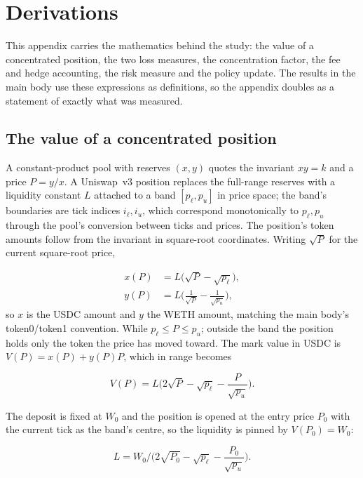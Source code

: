 \section{Derivations}
\label{app:derivations}

This appendix carries the mathematics behind the study: the value of a
concentrated position, the two loss measures, the concentration factor, the
fee and hedge accounting, the risk measure and the policy update. The results
in the main body use these expressions as definitions, so the appendix doubles
as a statement of exactly what was measured.

\subsection{The value of a concentrated position}

A constant-product pool with reserves $(x,y)$ quotes the invariant
$xy=k$ and a price $P=y/x$. A Uniswap~v3 position replaces the full-range
reserves with a liquidity constant $L$ attached to a band
$[p_\ell,p_u]$ in price space; the band's boundaries are tick indices
$i_\ell,i_u$, which correspond monotonically to $p_\ell,p_u$ through the
pool's conversion between ticks and prices. The position's token amounts follow from the
invariant in square-root coordinates. Writing $\sqrt{P}$ for the current
square-root price,

\begin{align}
x(P) &= L\big(\sqrt{P}-\sqrt{p_\ell}\big),
\label{eq:app-x}\\
y(P) &= L\Big(\frac{1}{\sqrt{P}}-\frac{1}{\sqrt{p_u}}\Big),
\label{eq:app-y}
\end{align}
so $x$ is the USDC amount and $y$ the WETH amount, matching the main body's
token0/token1 convention. While $p_\ell\le P\le p_u$; outside the band the
position holds only the token the price has moved toward. The mark value in
USDC is $V(P)=x(P)+y(P)P$, which in range becomes

\begin{equation}
V(P) = L\Big(2\sqrt{P}-\sqrt{p_\ell}-\frac{P}{\sqrt{p_u}}\Big).
\label{eq:app-value}
\end{equation}

The deposit is fixed at $W_0$ and the position is opened at the entry price
$P_0$ with the current tick as the band's centre, so the liquidity is pinned
by $V(P_0)=W_0$:

\begin{equation}
L = W_0 \Big/ \Big(2\sqrt{P_0}-\sqrt{p_\ell}-\frac{P_0}{\sqrt{p_u}}\Big).
\label{eq:app-L}
\end{equation}

